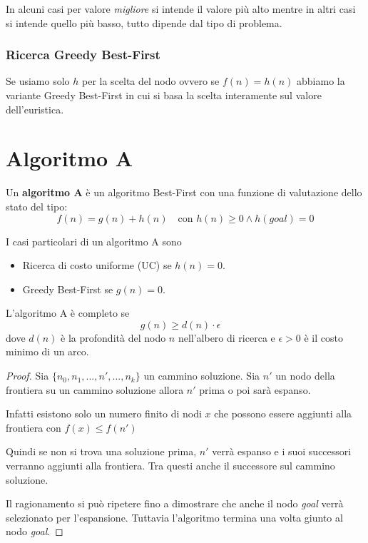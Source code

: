 In alcuni casi per valore \emph{migliore} si intende il valore pi\`u alto mentre in altri
casi si intende quello pi\`u basso, tutto dipende dal tipo di problema.

\subsubsection{Ricerca Greedy Best-First}
Se usiamo solo $h$ per la scelta del nodo ovvero se $f(n) = h(n)$ abbiamo la variante
Greedy Best-First in cui si basa la scelta interamente sul valore dell'euristica.

\section{Algoritmo A}
\begin{definition}
	Un \textbf{algoritmo A} \`e un algoritmo Best-First con una funzione di valutazione
	dello stato del tipo:
	\[ f(n) = g(n) + h(n) \quad \text{con } h(n) \geq 0 \wedge h(goal) = 0 \]
\end{definition}
I casi particolari di un algoritmo A sono
\begin{itemize}
	\item Ricerca di costo uniforme (UC) se $h(n) = 0$.
	\item Greedy Best-First se $g(n) = 0$.
\end{itemize}

\begin{theorem}
	L'algoritmo A \`e completo se
	\[ g(n) \geq d(n) \cdot \epsilon \quad \]
	dove $d(n)$ \`e la profondit\`a del nodo $n$ nell'albero di ricerca e $\epsilon > 0$
	\`e il costo minimo di un arco.
	\begin{proof}
		Sia $\{ n_0, n_1, ..., n', ..., n_k \}$ un cammino soluzione. Sia $n'$ un nodo
		della frontiera su un cammino soluzione allora $n'$ prima o poi sar\`a espanso.

		Infatti esistono solo un numero finito di nodi $x$ che possono essere aggiunti
		alla frontiera con $f(x) \leq f(n')$

		Quindi se non si trova una soluzione prima, $n'$ verr\`a espanso e i suoi
		successori verranno aggiunti alla frontiera. Tra questi anche il successore sul
		cammino soluzione.

		Il ragionamento si pu\`o ripetere fino a dimostrare che anche il nodo \emph{goal}
		verr\`a selezionato per l'espansione. Tuttavia l'algoritmo termina una volta
		giunto al nodo \emph{goal}.
	\end{proof}
\end{theorem}

